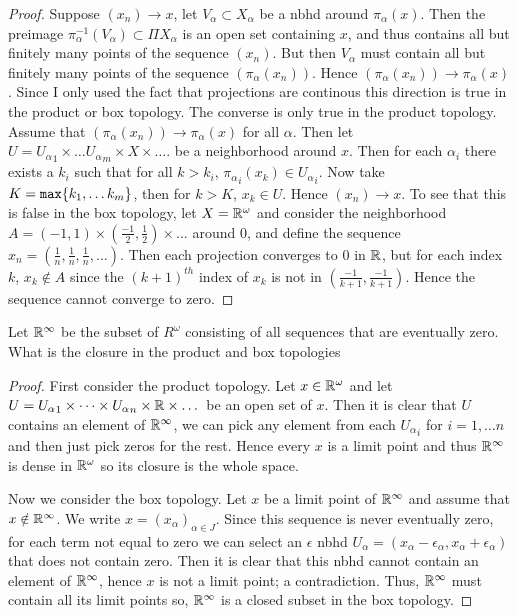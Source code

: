     \begin{proof}
        Suppose $(x_n) \rightarrow x$, let $V_\alpha \subset X_\alpha$ be a nbhd around $\pi_\alpha(x)$. Then the preimage $\pi_\alpha^{-1}(V_\alpha) \subset \Pi X_\alpha$ is an open set containing $x$, and thus contains all but finitely many points 
        of the sequence $(x_n)$. But then $V_\alpha$ must contain all but finitely many points of the sequence $(\pi_\alpha(x_n))$. Hence $(\pi_\alpha(x_n)) \rightarrow \pi_\alpha(x)$. Since I only used the fact that projections are continous 
        this direction is true in the product or box topology. The converse is only true in the product topology. Assume that $(\pi_\alpha(x_n)) \rightarrow \pi_\alpha(x)$ for all $\alpha$. Then let $U = {U_\alpha}_1 \times \dots {U_\alpha}_m \times X \times \dots$. 
        be a neighborhood around $x$. Then for each $\alpha_i$ there exists a $k_i$ such that for all $k > k_i$, ${\pi_\alpha}_i(x_k) \in {U_\alpha}_i$. Now take $K = {\tt max}\{k_1, \dots k_m\}$, then for $k > K$, 
        $x_k \in U$. Hence $(x_n) \rightarrow x$. To see that this is false in the box topology, let $X = \mathbb{R}^\omega$ and consider the neighborhood $A = (-1, 1) \times (\frac{-1}{2}, \frac{1}{2}) \times \dots$ around $0$, and define the sequence 
        $x_n = (\frac{1}{n}, \frac{1}{n}, \frac{1}{n}, \dots)$. Then each projection converges to $0$ in $\mathbb{R}$, but for each index $k$, $x_k \notin A$ since the $(k+1)^{th}$ index of $x_k$ is not in $(\frac{-1}{k+1}, \frac{-1}{k+1})$. Hence the sequence cannot 
        converge to zero. 


    \end{proof}


    \question 
    Let $\mathbb{R}^\infty$ be the subset of $R^\omega$ consisting of all sequences that are eventually zero. What is the closure in the product and box topologies

    \begin{proof}
        First consider the product topology. Let $x \in \mathbb{R}^\omega$ and let $U = {U_\alpha}_1 \times \dots \times {U_\alpha}_n \times \mathbb{R} \times \dots$ be an open set 
        of $x$. Then it is clear that $U$ contains an element of $\mathbb{R}^\infty$, we can pick any element from each ${U_\alpha}_i$ for $i = 1, \dots n$ and then just pick zeros for the rest. 
        Hence every $x$ is a limit point and thus $\mathbb{R}^\infty $ is dense in $\mathbb{R}^\omega$ so its closure is the whole space. 


        Now we consider the box topology. Let $x$ be a limit point of $\mathbb{R}^\infty$ and assume that $x \notin \mathbb{R}^\infty$. We write $x = (x_\alpha)_{\alpha \in J}$. Since this sequence is never eventually zero, 
        for each term not equal to zero we can select an $\epsilon$ nbhd $U_\alpha = (x_\alpha - \epsilon_\alpha, x_\alpha + \epsilon_\alpha)$ that does not contain zero. 
        Then it is clear that this nbhd cannot contain an element of $\mathbb{R}^\infty$, hence $x$ is not a limit point; a contradiction. Thus, $\mathbb{R}^\infty$ must contain all its limit points so, $\mathbb{R}^\infty$ is a closed subset in the box topology. 
    \end{proof}


